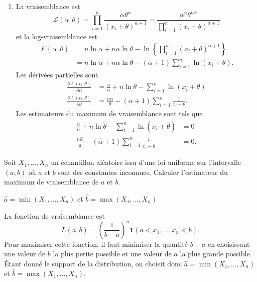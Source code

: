 \begin{exercice}
\begin{sol}
\begin{enumerate}
\item La vraisemblance est
$$
\mathcal{L}(\alpha,\theta)=\prod_{i=1}^n\frac{\alpha\theta^\alpha}{(x_i+\theta)^{\alpha+1}}=\frac{\alpha^n\theta^{n\alpha}}{\prod_{i=1}^n(x_i+\theta)^{\alpha+1}}
$$
et la log-vraisemblance est
\begin{align*}
\ell(\alpha,\theta)&=n\ln \alpha+n\alpha\ln \theta-\ln\left\{\prod_{i=1}^n(x_i+\theta)^{\alpha+1}\right\}\\
&=n\ln \alpha+n\alpha\ln \theta-(\alpha+1)\sum_{i=1}^n\ln(x_i+\theta).
\end{align*}
Les dérivées partielles sont
\begin{align*}
\frac{\partial\ell(\alpha,\theta)}{\partial \alpha}&=\frac{n}{ \alpha}+n\ln \theta-\sum_{i=1}^n\ln(x_i+\theta)\\
\frac{\partial\ell(\alpha,\theta)}{\partial \theta}&=\frac{n\alpha}{ \theta}-(\alpha+1)\sum_{i=1}^n\frac{1}{x_i+\theta}.
\end{align*}
Les estimateurs du maximum de vraisemblance sont tels que
\begin{align*}
\frac{n}{\hat\alpha}+n\ln \hat\theta-\sum_{i=1}^n\ln(x_i+\hat\theta)&=0\\
\frac{n\hat\alpha}{ \hat\theta}-(\hat\alpha+1)\sum_{i=1}^n\frac{1}{x_i+\hat\theta}&=0.
\end{align*}
\end{enumerate}
\end{sol}
\end{exercice}

\begin{exercice}
  Soit $X_1, \dots, X_n$ un échantillon aléatoire issu d'une loi
  uniforme sur l'intervalle $(a, b)$ où $a$ et $b$ sont des constantes
  inconnues. Calculer l'estimateur du maximum de vraisemblance de $a$
  et $b$.
  \begin{rep}
    $\hat{a} = \min(X_1, \dots, X_n)$ et $\hat{b} = \max(X_1, \dots,
    X_n)$
  \end{rep}
  \begin{sol}
    La fonction de vraisemblance est
    \begin{equation*}
      L(a, b) = \left( \frac{1}{b - a} \right)^n\mathbf{1}(a < x_1, \dots, x_n < b).
    \end{equation*}
    Pour maximiser cette fonction, il
    faut minimiser la quantité $b - a$ en choisissant une valeur de
    $b$ la plus petite possible et une valeur de $a$ la plus grande
    possible. Étant donné le support de la distribution, on choisit
    donc $\hat{a} = \min(X_1, \dots, X_n)$ et $\hat{b} = \max(X_1,
    \dots, X_n)$.
  \end{sol}
\end{exercice}

